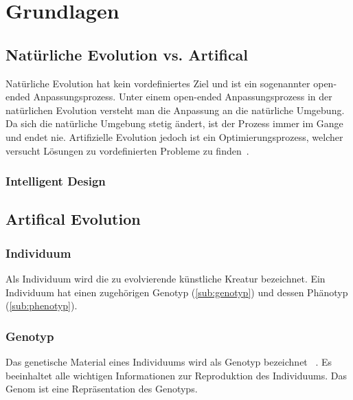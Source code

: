 %
%


\chapter{Grundlagen}

\section{Natürliche Evolution vs. Artifical}

  Natürliche Evolution hat kein vordefiniertes Ziel und ist ein sogenannter open-ended Anpassungsprozess.
  Unter einem open-ended Anpassungsprozess in der natürlichen Evolution versteht man die Anpassung an die natürliche Umgebung.
  Da sich die natürliche Umgebung stetig ändert, ist der Prozess immer im Gange und endet nie.
  Artifizielle Evolution jedoch ist ein Optimierungsprozess,
  welcher versucht Lösungen zu vordefinierten Probleme zu finden~\cite[S.1]{book:bioInspired}.

  \subsection{Intelligent Design\label{sub:IntelligentDesign}}


\section{Artifical Evolution}

    \subsection{Individuum\label{sub:individual}}
      Als Individuum wird die zu evolvierende künstliche Kreatur bezeichnet.
      Ein Individuum hat einen zugehörigen Genotyp (\vref{sub:genotyp}) und dessen Phänotyp (\vref{sub:phenotyp}).
    \subsection{Genotyp\label{sub:genotyp}}
        Das genetische Material eines Individuums wird als Genotyp bezeichnet ~\cite[S.5]{book:bioInspired}.
        Es beeinhaltet alle wichtigen Informationen zur Reproduktion des Individuums.
        Das Genom ist eine Repräsentation des Genotyps.
